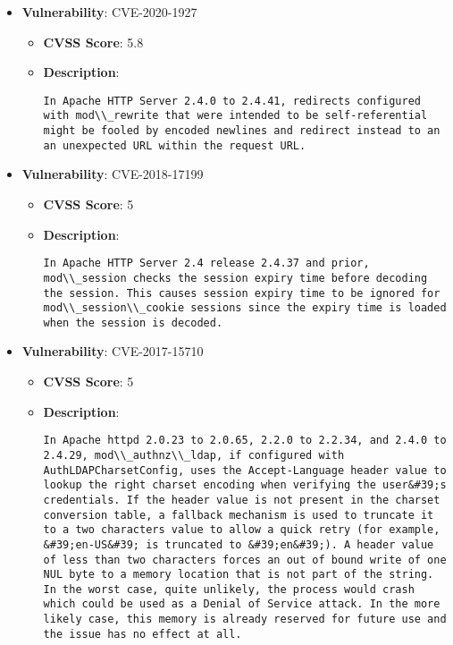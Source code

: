 \documentclass{article}
\begin{document}
\begin{itemize}
        \item \textbf{Vulnerability}: CVE-2020-1927
        \begin{itemize}
            \item \textbf{CVSS Score}:  5.8 
            \item \textbf{Description}:
            \parbox[t]{0.9\linewidth}{
                \verb|In Apache HTTP Server 2.4.0 to 2.4.41, redirects configured with mod\\_rewrite that were intended to be self-referential might be fooled by encoded newlines and redirect instead to an an unexpected URL within the request URL.|
            }
        \end{itemize}
    
        \item \textbf{Vulnerability}: CVE-2018-17199
        \begin{itemize}
            \item \textbf{CVSS Score}:  5 
            \item \textbf{Description}:
            \parbox[t]{0.9\linewidth}{
                \verb|In Apache HTTP Server 2.4 release 2.4.37 and prior, mod\\_session checks the session expiry time before decoding the session. This causes session expiry time to be ignored for mod\\_session\\_cookie sessions since the expiry time is loaded when the session is decoded.|
            }
        \end{itemize}
    
        \item \textbf{Vulnerability}: CVE-2017-15710
        \begin{itemize}
            \item \textbf{CVSS Score}:  5 
            \item \textbf{Description}:
            \parbox[t]{0.9\linewidth}{
                \verb|In Apache httpd 2.0.23 to 2.0.65, 2.2.0 to 2.2.34, and 2.4.0 to 2.4.29, mod\\_authnz\\_ldap, if configured with AuthLDAPCharsetConfig, uses the Accept-Language header value to lookup the right charset encoding when verifying the user&#39;s credentials. If the header value is not present in the charset conversion table, a fallback mechanism is used to truncate it to a two characters value to allow a quick retry (for example, &#39;en-US&#39; is truncated to &#39;en&#39;). A header value of less than two characters forces an out of bound write of one NUL byte to a memory location that is not part of the string. In the worst case, quite unlikely, the process would crash which could be used as a Denial of Service attack. In the more likely case, this memory is already reserved for future use and the issue has no effect at all.|
            }
        \end{itemize}
    

\end{itemize}
\end{document}
